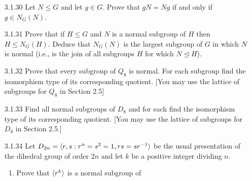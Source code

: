 \begin{enumerate}
      \textbf{Proof.} If $T$ or $S$ is empty, then the problem is trivial, so
      assume that both sets are nonempty. Suppose first that $N$ is normal in
      $G$. Let $t \in T$. Since $T$ generates $G$, it follows particularly that
      $t \in G$, so that $t$ normalizes $N$. Thus $tSt^{-1} \subseteq N$ by
      Exercise 28. Conversely, suppose that $tSt^{-1} \subseteq N$ for each
      $t \in T$. Since $G = \cyc{T}$, it follows that $T \subseteq G$, so that
      each $t\in T$ normalizes $N$ by Exercise 28. Thus $T \subseteq N_G(N)$, 
      and since $N_G(N)$ is a group, it follows by closure that
      $G = \cyc{T} \subseteq N_G(N)$. But $N_G(N) \subseteq G$ by definition;
      thus $G = N_G(N)$; that is, $N \trianglelefteq G$. \qed
   \item[3.1.30]  Let $N \le G$ and let $g \in G$. Prove that $gN = Ng$ if and
                  only if $g \in N_G(N)$.
   \item[3.1.31]  Prove that if $H \le G$ and $N$ is a normal subgroup of $H$
                  then $H \le N_G(H)$. Deduce that $N_G(N)$ is the largest
                  subgroup of $G$ in which $N$ is normal (i.e., is the join of
                  all subgroups $H$ for which $N \trianglelefteq H$).
   \item[3.1.32]  Prove that every subgroup of $Q_8$ is normal. For each
                  subgroup find the isomorphism type of its corresponding
                  quotient. [You may use the lattice of subgroups for $Q_8$ in
                  Section 2.5]
   \item[3.1.33]  Find all normal subgroups of $D_8$ and for each find the
                  isomorphism type of its corresponding quotient. [You may use
                  the lattice of subgroups for $D_8$ in Section 2.5.]
   \item[3.1.34]  Let $D_{2n} = \langle r, s : r^n = s^2 = 1, rs = sr^{-1} \rangle$ be the
                  usual presentation of the dihedral group of order $2n$ and let
                  $k$ be a positive integer dividing $n$.
                  \begin{enumerate}
                     \item Prove that $\langle r^k \rangle$ is a normal subgroup of

\end{enumerate}
\end{enumerate}
